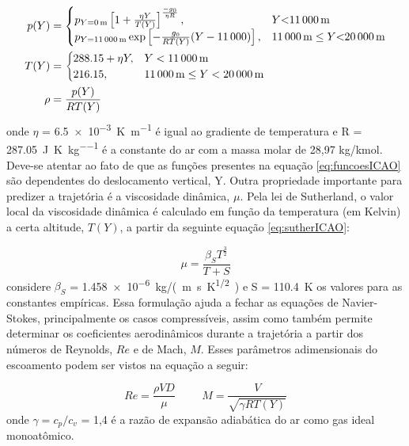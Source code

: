 \begin{equation}
\label{eq:funcoesICAO}
\begin{aligned}
p(Y) &=\begin{cases}
			p_{Y=\qty{0}{\metre}}\left[1 + \frac{\eta Y}{T(Y)} \right]^{\frac{-g_{0}}{\eta R}} , & Y \qty{< 11000}{\metre}\\
            p_{Y=\qty{11000}{\metre}} \exp\left[-\frac{g_{0}}{RT(Y)}(Y-\num{11000}) \right], & \qty{11000}{\metre} \leq Y \qty{< 20000}{\metre}
		 \end{cases}
\\
T(Y) &=\begin{cases}
			\num{288,15} + \eta Y, & Y < \qty{11000}{\metre}\\
            \num{216,15}, & \qty{11000}{\metre} \leq Y < \qty{20000}{\metre}
		 \end{cases}
\\
\rho &= \frac{p(Y)}{RT(Y)}
\end{aligned}
\end{equation}
%
onde \(\eta\) = \qty{6,5e-3}{\kelvin\per\metre} é igual ao gradiente de temperatura e R = \qty{287,05}{\joule\per\kelvin\per\kilogram} é a constante do ar com a massa molar de 28,97 kg/kmol. Deve-se atentar ao fato de que as funções presentes na equação \ref{eq:funcoesICAO} são dependentes do deslocamento vertical, Y. Outra propriedade importante para predizer a trajetória é a viscosidade dinâmica, \(\mu\). Pela lei de Sutherland, o valor local da viscosidade dinâmica é calculado em função da temperatura (em Kelvin) a certa altitude, \(T(Y)\), a partir da seguinte equação \ref{eq:sutherICAO}:

\begin{equation}
\label{eq:sutherICAO}
\mu = \frac{\beta_{S}T^{\frac{3}{2}}}{T + S}
\end{equation}
%
considere \(\beta_{S}\) = \qty{1,458e-6}{kg/(m.s.K^{1/2})} e S = \qty{110,4}{\kelvin} os valores para as constantes empíricas. Essa formulação ajuda a fechar as equações de Navier-Stokes, principalmente os casos compressíveis, assim como também permite determinar os coeficientes aerodinâmicos durante a trajetória a partir dos números de Reynolds, \(Re\) e de Mach, \(M\). Esses parâmetros adimensionais do escoamento podem ser vistos na equação a seguir:

\begin{equation}
    Re = \frac{\rho V D}{\mu} \hspace{1cm}
    M = \frac{V}{\sqrt{\gamma RT(Y)}}
\end{equation}
%
onde \(\gamma = c_{p}/c_{v}\) = 1,4 é a razão de expansão adiabática do ar como gas ideal monoatômico.
